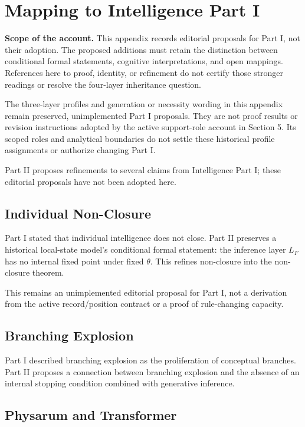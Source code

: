 \section{Mapping to Intelligence Part I}

\noindent\textbf{Scope of the account.} This appendix records editorial proposals for Part I, not their adoption. The proposed additions must retain the distinction between conditional formal statements, cognitive interpretations, and open mappings. References here to proof, identity, or refinement do not certify those stronger readings or resolve the four-layer inheritance question.

The three-layer profiles and generation or necessity wording in this appendix remain preserved, unimplemented Part I proposals. They are not proof results or revision instructions adopted by the active support-role account in Section 5. Its scoped roles and analytical boundaries do not settle these historical profile assignments or authorize changing Part I.


Part II proposes refinements to several claims from Intelligence Part I; these editorial proposals have not been adopted here.

\subsection{Individual Non-Closure}

Part I stated that individual intelligence does not close. Part II preserves a historical local-state model's conditional formal statement: the inference layer $L_F$ has no internal fixed point under fixed $\theta$. This refines non-closure into the non-closure theorem.

This remains an unimplemented editorial proposal for Part I, not a derivation from the active record/position contract or a proof of rule-changing capacity.

\subsection{Branching Explosion}

Part I described branching explosion as the proliferation of conceptual branches. Part II proposes a connection between branching explosion and the absence of an internal stopping condition combined with generative inference.

\subsection{Physarum and Transformer}

